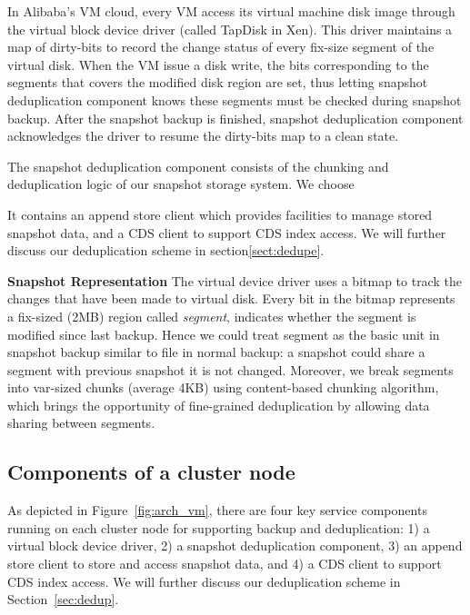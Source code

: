 {%
In Alibaba's VM cloud, every VM access its virtual machine disk image through the
virtual block device driver (called TapDisk\cite{Warfield2005} in Xen).
This driver maintains a map of dirty-bits to record
the change status of every fix-size segment of the virtual disk. 
When the VM issue a disk write, the bits corresponding to the segments that covers 
the modified disk region are set, thus letting snapshot deduplication component knows these
segments must be checked during snapshot backup. After the snapshot backup is finished, 
snapshot deduplication component acknowledges the driver to resume the dirty-bits map to
a clean state.

The snapshot deduplication component consists of the chunking and deduplication 
logic of our snapshot storage system. We choose 

It contains an append store client which provides facilities to manage stored snapshot data, and a CDS client to support CDS index access. We will further discuss our deduplication scheme in section\ref{sect:dedupe}.


{\bf Snapshot Representation}
The virtual device driver uses a bitmap to track the changes 
that have been made to virtual disk.
Every bit in the bitmap represents a fix-sized (2MB) region called \textit{segment}, indicates whether the segment
is modified since last backup. Hence we could treat segment as the basic unit 
in snapshot backup similar to
file in normal backup: a snapshot could share a segment with previous snapshot it is not changed. 
Moreover, we break segments into var-sized chunks (average 4KB) using content-based chunking algorithm,
which brings the opportunity of fine-grained deduplication by
allowing data sharing between segments.
}

\subsection{ Components of a cluster node } 

As  depicted in Figure~\ref{fig:arch_vm}, 
there are four key service components running on each cluster
node  for supporting backup and deduplication: 
1) a virtual block device driver, 2) a snapshot deduplication component,
3) an append store client to store  and access snapshot data,
and 4)  a CDS client to support CDS index access. We will further discuss our deduplication scheme 
in Section~\ref{sec:dedup}.


